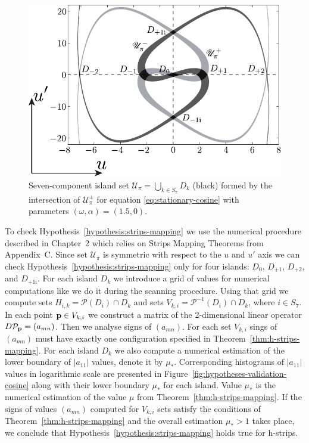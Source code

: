 \begin{figure}[h]
\centering
	\includegraphics[scale = 1]{pic/island set to check hypotheses for cosine equation}
	\caption{
		Seven-component island set $\mathscr{U}_{\pi} = \bigcup_{k \in S_7} D_k$ (black) formed by the intersection of $\mathscr{U}_{\pi}^{\pm}$ for equation \eqref{eq:stationary-cosine} with parameters $(\omega, \alpha) = (1.5, 0)$.
	}
\label{fig:island-set-cosine}
\end{figure}

To check Hypothesis~\ref{hypothesis:strips-mapping} we use the numerical procedure described in Chapter~2 which relies on Strips Mapping Theorems from Appendix~C.
Since set $\mathscr{U}_{\pi}$ is symmetric with respect to the $u$ and $u'$ axis we can check Hypothesis~\ref{hypothesis:strips-mapping} only for four islands: $D_0$, $D_{+1}$, $D_{+2}$, and $D_{+1\mathrm{i}}$.
For each island $D_k$ we introduce a grid of values for numerical computations like we do it during the scanning procedure.
Using that grid we compute sets $H_{i, k} = \mathcal{P}(D_i) \cap D_k$ and sets $V_{k, i} = \mathcal{P}^{-1}(D_i) \cap D_k$, where $i \in S_7$.
In each point $\vb{p} \in V_{k, i}$ we construct a matrix of the 2-dimensional linear operator $D \mathcal{P}_{\vb{p}} = (a_{mn})$.
Then we analyse signs of $(a_{mn})$.
For each set $V_{k, i}$ sings of $(a_{mn})$ must have exactly one configuration specified in Theorem~\ref{thm:h-strips-mapping}.
For each island $D_k$ we also compute a numerical estimation of the lower boundary of $|a_{11}|$ values, denote it by $\mu_*$.
Corresponding histograms of $|a_{11}|$ values in logarithmic scale are presented in Figure~\ref{fig:hypotheses-validation-cosine} along with their lower boundary $\mu_*$ for each island.
Value $\mu_*$ is the numerical estimation of the value $\mu$ from Theorem~\ref{thm:h-strips-mapping}.
If the signs of values $(a_{mn})$ computed for $V_{k, i}$ sets satisfy the conditions of Theorem~\ref{thm:h-strips-mapping} and the overall estimation $\mu_* > 1$ takes place, we conclude that Hypothesis~\ref{hypothesis:strips-mapping} holds true for h-strips.

